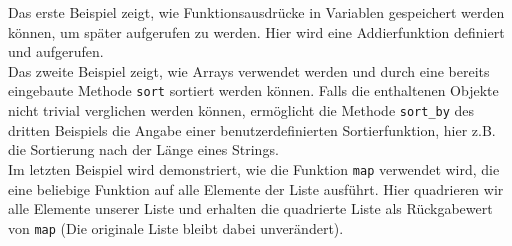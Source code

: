 \begin{ruby}[label=IRB]
         

\PY{o}{[}\PY{o}{]}

\PY{o}{[}      \PY{o}{]}   

   
\end{ruby}
Das erste Beispiel zeigt, wie Funktionsausdrücke in Variablen gespeichert werden können, um später aufgerufen zu werden. Hier wird eine Addierfunktion definiert und aufgerufen.\\
Das zweite Beispiel zeigt, wie Arrays verwendet werden und durch eine bereits eingebaute Methode \texttt{sort} sortiert werden können. Falls die enthaltenen Objekte nicht trivial verglichen werden können, ermöglicht die Methode \texttt{sort\_by} des dritten Beispiels die Angabe einer benutzerdefinierten Sortierfunktion, hier z.B. die Sortierung nach der Länge eines Strings.\\
Im letzten Beispiel wird demonstriert, wie die Funktion \texttt{map} verwendet wird, die eine beliebige Funktion auf alle Elemente der Liste ausführt. Hier quadrieren wir alle Elemente unserer Liste und erhalten die quadrierte Liste als Rückgabewert von \texttt{map} (Die originale Liste bleibt dabei unverändert).



